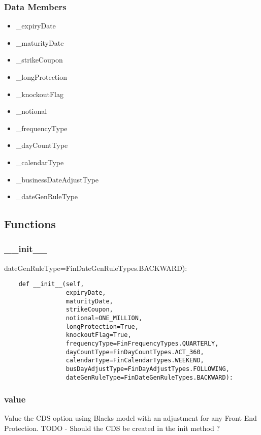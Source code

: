 \documentclass[twoside,11pt]{book}
\begin{document}
\subsubsection*{Data Members}
\begin{itemize}
\item{\_expiryDate}
\item{\_maturityDate}
\item{\_strikeCoupon}
\item{\_longProtection}
\item{\_knockoutFlag}
\item{\_notional}
\item{\_frequencyType}
\item{\_dayCountType}
\item{\_calendarType}
\item{\_businessDateAdjustType}
\item{\_dateGenRuleType}
\end{itemize}

\subsection*{Functions}

\subsubsection*{{\bf \_\_init\_\_}}
dateGenRuleType=FinDateGenRuleTypes.BACKWARD): 

\begin{lstlisting}
    def __init__(self,
                 expiryDate,
                 maturityDate,
                 strikeCoupon,
                 notional=ONE_MILLION,
                 longProtection=True,
                 knockoutFlag=True,
                 frequencyType=FinFrequencyTypes.QUARTERLY,
                 dayCountType=FinDayCountTypes.ACT_360,
                 calendarType=FinCalendarTypes.WEEKEND,
                 busDayAdjustType=FinDayAdjustTypes.FOLLOWING,
                 dateGenRuleType=FinDateGenRuleTypes.BACKWARD):
\end{lstlisting}

\subsubsection*{{\bf value}}
Value the CDS option using Blacks model with an adjustment for any Front End Protection. TODO - Should the CDS be created in the init method ?  
\end{document}
